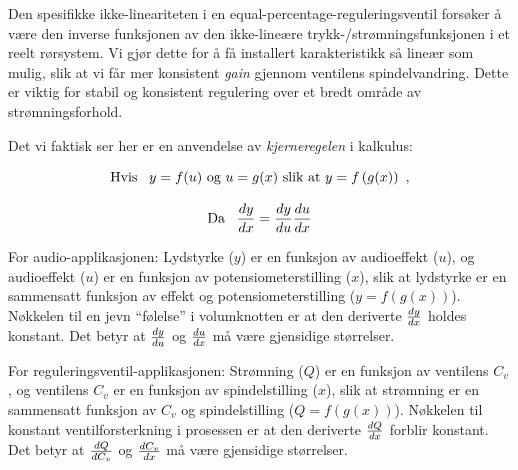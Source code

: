 





Den spesifikke ikke-lineariteten i en equal-percentage-reguleringsventil forsøker å være den inverse funksjonen av den ikke-lineære trykk-/strømningsfunksjonen i et reelt rørsystem. Vi gjør dette for å få installert karakteristikk så lineær som mulig, slik at vi får mer konsistent {\it gain} gjennom ventilens spindelvandring. Dette er viktig for stabil og konsistent regulering over et bredt område av strømningsforhold.

\vskip 10pt

Det vi faktisk ser her er en anvendelse av {\it kjerneregelen} i kalkulus:

$$\hbox{Hvis \hskip 5pt} y = f(u) \hbox{ og } u = g(x) \hbox{ slik at } y = f\left(g(x)\right) \hbox{ ,}$$

$$\hbox{Da \hskip 5pt} {dy \over dx} = {dy \over du}{du \over dx}$$

\filbreak

For audio-applikasjonen: Lydstyrke ($y$) er en funksjon av audioeffekt ($u$), og audioeffekt ($u$) er en funksjon av potensiometerstilling ($x$), slik at lydstyrke er en sammensatt funksjon av effekt og potensiometerstilling ($y = f(g(x))$). Nøkkelen til en jevn ``følelse'' i volumknotten er at den deriverte $dy \over dx$ holdes konstant. Det betyr at $dy \over du$ og $du \over dx$ må være gjensidige størrelser.

\vskip 10pt

For reguleringsventil-applikasjonen: Strømning ($Q$) er en funksjon av ventilens $C_v$, og ventilens $C_v$ er en funksjon av spindelstilling ($x$), slik at strømning er en sammensatt funksjon av $C_v$ og spindelstilling ($Q = f(g(x))$). Nøkkelen til konstant ventilforsterkning i prosessen er at den deriverte $dQ \over dx$ forblir konstant. Det betyr at $dQ \over dC_v$ og $dC_v \over dx$ må være gjensidige størrelser.


